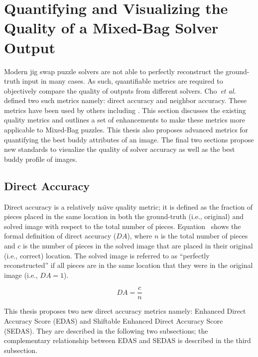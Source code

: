 \chapter{Quantifying and Visualizing the Quality of a Mixed-Bag Solver Output}\label{chap:quantifyingSolverQuantify}

Modern jig swap puzzle solvers are not able to perfectly reconstruct the ground-truth input in many cases.  As such, quantifiable metrics are required to objectively compare the quality of outputs from different solvers.  Cho~\textit{et al.}~\cite{cho2010} defined two such metrics namely: direct accuracy and neighbor accuracy. These metrics have been used by others including \cite{sholomon2013, pomeranz2011, paikin2015, son2014, gallagher2012}.  This section discusses the existing quality metrics and outlines a set of enhancements to make these metrics more applicable to Mixed-Bag puzzles.  This thesis also proposes advanced metrics for quantifying the best buddy attributes of an image.  The final two sections propose new standards to visualize the quality of solver accuracy as well as the best buddy profile of images.

\section{Direct Accuracy}\label{sec:directAccuracy}

Direct accuracy is a relatively na\"{\i}ve quality metric; it is defined as the fraction of pieces placed in the same location in both the ground-truth (i.e., original) and solved image with respect to the total number of pieces. Equation~ shows the formal definition of direct accuracy ($DA$), where $n$ is the total number of pieces and $c$ is the number of pieces in the solved image that are placed in their original (i.e., correct) location.  The solved image is referred to as ``perfectly reconstructed'' if all pieces are in the same location that they were in the original image (i.e., $DA=1$).

\begin{equation} \label{eq:directAccuracy}
DA = \frac{c}{n}
\end{equation}

This thesis proposes two new direct accuracy metrics namely: Enhanced Direct Accuracy Score (EDAS) and Shiftable Enhanced Direct Accuracy Score (SEDAS).  They are described in the following two subsections; the complementary relationship between EDAS and SEDAS is described in the third subsection.

